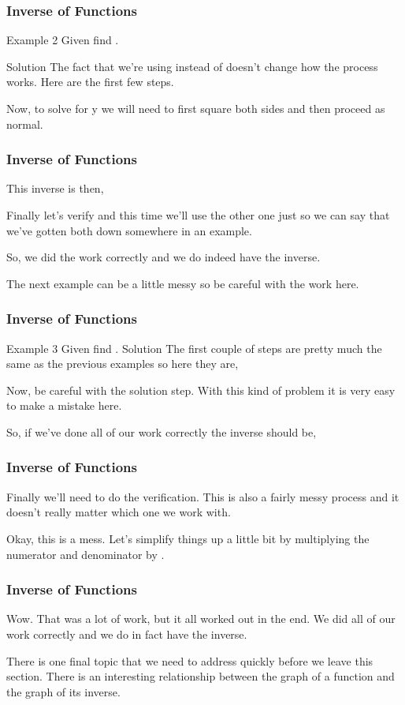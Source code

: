 \documentclass{beamer}
\begin{document}
\begin{frame}[fragile]
	\frametitle{Inverse of Functions}
	\Large
Example 2  Given   find .

Solution
The fact that we’re using  instead of  doesn’t change how the process works.  Here are the first few steps.


Now, to solve for y we will need to first square both sides and then proceed as normal.

\end{frame}
\begin{frame}[fragile]
	\frametitle{Inverse of Functions}
	\Large
This inverse is then,


Finally let’s verify and this time we’ll use the other one just so we can say that we’ve gotten both down somewhere in an example.



So, we did the work correctly and we do indeed have the inverse.

The next example can be a little messy so be careful with the work here.
\end{frame}
\begin{frame}[fragile]
	\frametitle{Inverse of Functions}
	\Large
Example 3  Given   find .
Solution
The first couple of steps are pretty much the same as the previous examples so here they are,


Now, be careful with the solution step.  With this kind of problem it is very easy to make a mistake here.


So, if we’ve done all of our work correctly the inverse should be,

\end{frame}
\begin{frame}[fragile]
	\frametitle{Inverse of Functions}
	\Large
Finally we’ll need to do the verification.  This is also a fairly messy process and it doesn’t really matter which one we work with.


Okay, this is a mess.  Let’s simplify things up a little bit by multiplying the numerator and denominator by .

\end{frame}
\begin{frame}[fragile]
	\frametitle{Inverse of Functions}
	\Large
Wow.  That was a lot of work, but it all worked out in the end.  We did all of our work correctly and we do in fact have the inverse.

There is one final topic that we need to address quickly before we leave this section.  There is an interesting relationship between the graph of a function and the graph of its inverse.
\end{frame}
\end{document}
